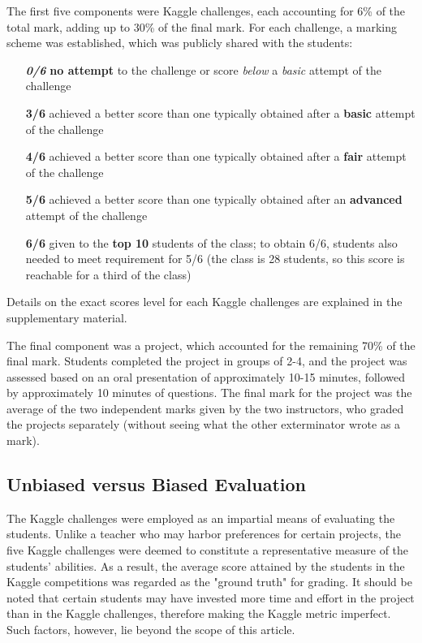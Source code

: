 \documentclass[a4paper]{article}
\begin{document}
	The first five components were Kaggle challenges, each accounting for 6\% of the total mark, adding up to 30\% of the final mark.
	For each challenge, a marking scheme was established, which was publicly shared with the students:
	\begin{itemize}
		\item [\textbf{\textit{0/6}}] \textbf{no attempt} to the challenge or score \textit{below} a \textit{basic} attempt of the challenge
		\item [\textbf{3/6}] achieved a better score than one typically obtained after a \textbf{basic} attempt of the challenge
		\item [\textbf{4/6}] achieved a better score than one typically obtained after a \textbf{fair} attempt of the challenge
		\item [\textbf{5/6}] achieved a better score than one typically obtained after an \textbf{advanced} attempt of the challenge
		\item [\textbf{6/6}] given to the \textbf{top 10} students of the class; to obtain 6/6, students also needed to meet requirement for 5/6 (the class is 28 students, so this score is reachable for a third of the class)

	\end{itemize}
	Details on the exact scores level for each Kaggle challenges are explained in the supplementary material.
	
	The final component was a project, which accounted for the remaining 70\% of the final mark.
	Students completed the project in groups of 2-4, and the project was assessed based on an oral presentation of approximately 10-15 minutes, followed by approximately 10 minutes of questions.
	The final mark for the project was the average of the two independent marks given by the two instructors, who graded the projects separately (without seeing what the other exterminator wrote as a mark).
	
	\subsection{Unbiased versus Biased Evaluation}
	The Kaggle challenges were employed as an impartial means of evaluating the students.
	Unlike a teacher who may harbor preferences for certain projects, the five Kaggle challenges were deemed to constitute a representative measure of the students' abilities.
	As a result, the average score attained by the students in the Kaggle competitions was regarded as the "ground truth" for grading.
	It should be noted that certain students may have invested more time and effort in the project than in the Kaggle challenges, therefore making the Kaggle metric imperfect.
	Such factors, however, lie beyond the scope of this article.
	
\end{document}

